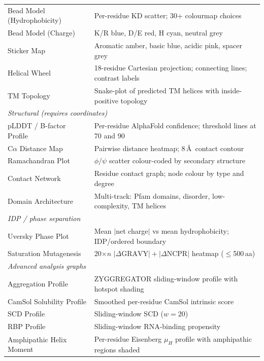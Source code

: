 \documentclass[12pt]{article}
\begin{document}
\begin{longtable}{p{4.5cm}p{9.5cm}}
Bead Model (Hydrophobicity)  & Per-residue KD scatter; 30+ colourmap choices \\
Bead Model (Charge)          & K/R blue, D/E red, H cyan, neutral grey \\
Sticker Map                  & Aromatic amber, basic blue, acidic pink, spacer grey \\
Helical Wheel                & 18-residue Cartesian projection; connecting lines; contrast labels \\
TM Topology                  & Snake-plot of predicted TM helices with inside-positive topology \\
\midrule
\multicolumn{2}{l}{\textit{Structural (requires coordinates)}}\\
pLDDT / B-factor Profile     & Per-residue AlphaFold confidence; threshold lines at 70 and 90 \\
C$\alpha$ Distance Map       & Pairwise distance heatmap; 8\,\AA\ contact contour \\
Ramachandran Plot            & $\phi$/$\psi$ scatter colour-coded by secondary structure \\
Contact Network              & Residue contact graph; node colour by type and degree \\
Domain Architecture          & Multi-track: Pfam domains, disorder, low-complexity, TM helices \\
\midrule
\multicolumn{2}{l}{\textit{IDP / phase separation}}\\
Uversky Phase Plot           & Mean $|$net charge$|$ vs mean hydrophobicity; IDP/ordered boundary \\
Saturation Mutagenesis       & 20$\times n$ $|\Delta\mathrm{GRAVY}| + |\Delta\mathrm{NCPR}|$ heatmap ($\leq$500\,aa) \\
\midrule
\multicolumn{2}{l}{\textit{Advanced analysis graphs}}\\
Aggregation Profile          & ZYGGREGATOR sliding-window profile with hotspot shading \\
CamSol Solubility Profile    & Smoothed per-residue CamSol intrinsic score \\
SCD Profile                  & Sliding-window SCD ($w=20$) \\
RBP Profile                  & Sliding-window RNA-binding propensity \\
Amphipathic Helix Moment     & Per-residue Eisenberg $\mu_H$ profile with amphipathic regions shaded \\
\end{longtable}
\end{document}

